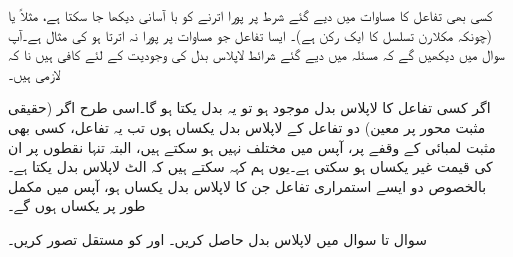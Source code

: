 کسی بھی تفاعل کا مساوات  میں دیے گئے شرط پر پورا اترنے کو با آسانی دیکھا جا سکتا ہے، مثلاً  یا  (چونکہ  مکلارن تسلسل کا ایک رکن ہے)۔ ایسا تفاعل جو مساوات  پر پورا نہ اترتا ہو کی مثال  ہے۔آپ سوال  میں دیکھیں گے کہ مسئلہ  میں دیے گئے شرائط لاپلاس بدل کی وجودیت کے لئے کافی ہیں نا کہ لازمی ہیں۔

اگر کسی تفاعل کا لاپلاس بدل موجود ہو تو یہ بدل یکتا ہو گا۔اسی طرح اگر (حقیقی مثبت محور پر معین) دو تفاعل کے لاپلاس بدل یکساں ہوں تب یہ تفاعل، کسی بھی مثبت لمبائی کے وقفے پر،  آپس میں مختلف نہیں ہو سکتے ہیں، البتہ تنہا نقطوں پر ان کی قیمت غیر یکساں ہو سکتی ہے۔یوں ہم کہہ سکتے ہیں کہ الٹ لاپلاس بدل یکتا ہے۔ بالخصوص دو ایسے استمراری تفاعل جن کا لاپلاس بدل یکساں ہو، آپس میں مکمل طور پر یکساں ہوں گے۔ 

سوال  تا سوال  میں لاپلاس بدل حاصل کریں۔  اور   کو مستقل تصور کریں۔

